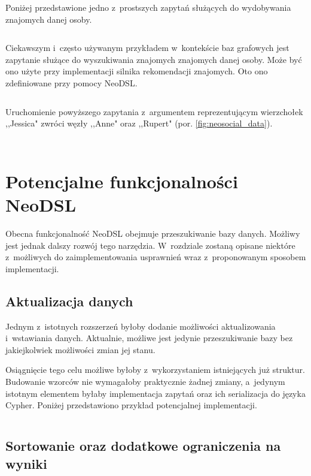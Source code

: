 \documentclass[brudnopis]{xmgr}
\begin{document}
Poniżej przedstawione jedno z~prostszych zapytań służących do wydobywania znajomych danej osoby.

\inputminted{scala}{listings/scala/examples/socialnetwork/person-friends-query.scala}

Ciekawszym i~często używanym przykładem w~kontekście baz grafowych jest zapytanie służące do wyszukiwania znajomych znajomych danej osoby. Może być ono użyte przy implementacji silnika rekomendacji znajomych. Oto ono zdefiniowane przy pomocy NeoDSL.

\inputminted{scala}{listings/scala/examples/socialnetwork/person-fof-query.scala}

Uruchomienie powyższego zapytania z~argumentem reprezentującym wierzchołek ,,Jessica" zwróci węzły ,,Anne" oraz ,,Rupert" (por. \ref{fig:neosocial_data}).

\inputminted{scala}{listings/scala/examples/socialnetwork/person-fof-result.scala}
\inputminted{text}{listings/text/person-fof-result.txt}

\chapter{Potencjalne funkcjonalności NeoDSL}

Obecna funkcjonalność NeoDSL obejmuje przeszukiwanie bazy danych. Możliwy jest jednak dalszy rozwój tego narzędzia. W~rozdziale zostaną opisane niektóre z~możliwych do zaimplementowania usprawnień wraz z~proponowanym sposobem implementacji.

\section{Aktualizacja danych}

Jednym z~istotnych rozszerzeń byłoby dodanie możliwości aktualizowania i~wstawiania danych. Aktualnie, możliwe jest jedynie przeszukiwanie bazy bez jakiejkolwiek możliwości zmian jej stanu. 

Osiągnięcie tego celu możliwe byłoby z~wykorzystaniem istniejących już struktur. Budowanie wzorców nie wymagałoby praktycznie żadnej zmiany, a~jedynym istotnym elementem byłaby implementacja zapytań oraz ich serializacja do języka Cypher. Poniżej przedstawiono przykład potencjalnej implementacji.

\inputminted{scala}{listings/scala/missing-features-update.scala}

\section{Sortowanie oraz dodatkowe ograniczenia na wyniki}
\end{document}
